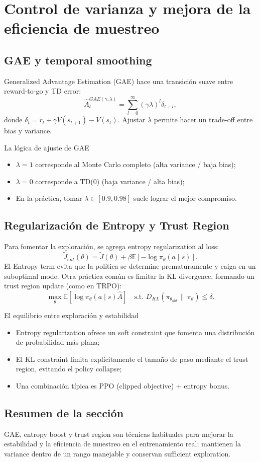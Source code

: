 \section{Control de varianza y mejora de la eficiencia de muestreo}
\subsection{GAE y temporal smoothing}
Generalized Advantage Estimation (GAE) hace una transición suave entre reward-to-go y TD error:
$$\hat{A}_t^{GAE(\gamma,\lambda)} = \sum_{l=0}^{\infty}(\gamma\lambda)^l \delta_{t+l},$$
donde $\delta_t = r_t + \gamma V(s_{t+1}) - V(s_t)$. Ajustar $\lambda$ permite hacer un trade-off entre bias y variance.

\begin{importantbox}{La lógica de ajuste de GAE}
\begin{itemize}
    \item $\lambda=1$ corresponde al Monte Carlo completo (alta variance / baja bias);
    \item $\lambda=0$ corresponde a TD(0) (baja variance / alta bias);
    \item En la práctica, tomar $\lambda \in [0.9,0.98]$ suele lograr el mejor compromiso.
\end{itemize}
\end{importantbox}

\subsection{Regularización de Entropy y Trust Region}
Para fomentar la exploración, se agrega entropy regularization al loss:
$$\tilde{J}_{ent}(\theta) = \tilde{J}(\theta) + \beta \mathbb{E}[-\log \pi_\theta(a\mid s)].$$
El Entropy term evita que la política se determine prematuramente y caiga en un suboptimal mode. Otra práctica común es limitar la KL divergence, formando un trust region update (como en TRPO):
$$\max_\theta \mathbb{E}[\log \pi_\theta(a\mid s) \hat{A}] \quad \text{s.t. } D_{KL}(\pi_{\theta_{old}} \,\|\, \pi_\theta) \le \delta.$$

\begin{knowledgebox}{El equilibrio entre exploración y estabilidad}
\begin{itemize}
    \item Entropy regularization ofrece un soft constraint que fomenta una distribución de probabilidad más plana;
    \item El KL constraint limita explícitamente el tamaño de paso mediante el trust region, evitando el policy collapse;
    \item Una combinación típica es PPO (clipped objective) + entropy bonus.
\end{itemize}
\end{knowledgebox}

\subsection{Resumen de la sección}
GAE, entropy boost y trust region son técnicas habituales para mejorar la estabilidad y la eficiencia de muestreo en el entrenamiento real; mantienen la variance dentro de un rango manejable y conservan sufficient exploration.

